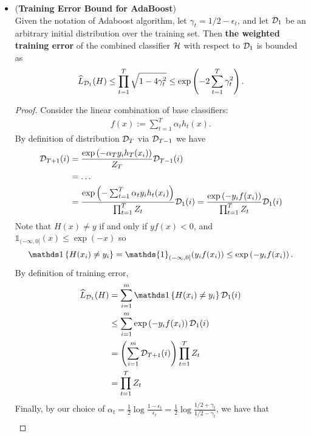 \documentclass[11pt]{article}
\begin{document}
\begin{itemize}
\item \begin{proposition}\label{prop: training_error_bound} (\textbf{Training Error Bound for AdaBoost}) \citep{schapire2012boosting}\\
Given the notation of Adaboost algorithm, let $\gamma_t = 1/2 - \epsilon_t$, and let ${\mathcal D}_1$ be an arbitrary initial distribution over the training set. Then \textbf{the weighted training error} of the combined classifier ${\mathcal H}$ with respect to ${\mathcal D}_1$ is bounded as
\begin{align}
\widehat{L}_{{\mathcal D}_1}(H) \le \prod_{t=1}^{T} \sqrt{1 - 4 \gamma_t^2} \le \exp\left(- 2 \sum_{t=1}^{T}\gamma_t^2\right). \label{ineqn: boosting_training_error_bound}
\end{align} 
\end{proposition}
\begin{proof}
Consider the linear combination of base classifiers:
\begin{align*}
f(x) := \sum_{t=1}^{T}\alpha_t h_t(x).
\end{align*} By definition of distribution ${\mathcal D}_T$ via ${\mathcal D}_{T-1}$ we have
\begin{align*}
{\mathcal D}_{T+1}(i) &= \frac{ \exp\left(-\alpha_T y_i h_T(x_i)\right)}{Z_T}{\mathcal D}_{T-1}(i)  \\
&= \ldots\\
&= \frac{ \exp\left(-\sum_{t=1}^{T}\alpha_t y_i h_t(x_i)\right)}{\prod_{t=1}^{T}Z_t}{\mathcal D}_{1}(i) = \frac{ \exp\left(- y_i f(x_i)\right)}{\prod_{t=1}^{T}Z_t} {\mathcal D}_{1}(i)
\end{align*} Note that $H(x) \neq y$ if and only if $y f(x) < 0$, and $\mathds{1}_{(-\infty, 0]}(x) \le \exp(-x)$ so
\begin{align*}
\ind{H(x_i) \neq y_i} = \mathds{1}_{(-\infty, 0]}(y_i f(x_i)) \le \exp\paren{- y_i f(x_i)}.
\end{align*} By definition of training error, 
\begin{align}
\widehat{L}_{\cD_1}(H) &= \sum_{i=1}^{m}\ind{H(x_i) \neq y_i} \cD_1(i) \nonumber\\
&\le \sum_{i=1}^{m} \exp\paren{- y_i f(x_i)} \cD_1(i)  \nonumber\\
&=  \paren{\sum_{i=1}^{m} \cD_{T+1}(i)}\prod_{t=1}^{T}Z_t  \nonumber\\
&= \prod_{t=1}^{T}Z_t \label{pf: training_error_bound_1}
\end{align} Finally, by our choice of $\alpha_t = \frac{1}{2}\log\frac{1 - \epsilon_t}{\epsilon_t} = \frac{1}{2}\log\frac{1/2 + \gamma_t}{1/2 - \gamma_t}$, we have that
\begin{align}

\end{align}
\end{proof}
\end{itemize}
\end{document}
